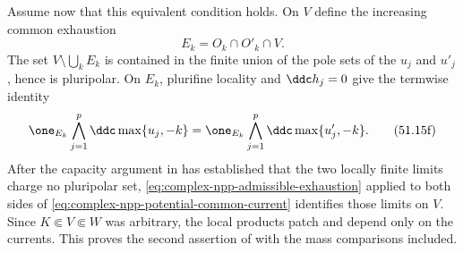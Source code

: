 Assume now that this equivalent condition holds.  On \(V\) define the
increasing common exhaustion
\[
                         E_k=O_k\cap O'_k\cap V.
\]
The set \(V\setminus\bigcup_kE_k\) is contained in the finite union of the
pole sets of the \(u_j\) and \(u'_j\), hence is pluripolar.  On \(E_k\),
plurifine locality and \(\ddc h_j=0\) give the termwise identity
\[
 \one_{E_k}\bigwedge_{j=1}^p\ddc\max\{u_j,-k\}
 =\one_{E_k}\bigwedge_{j=1}^p\ddc\max\{u'_j,-k\}.
\tag{51.15f}\label{eq:complex-npp-potential-common-current}
\]
After the capacity argument in  has established
that the two locally finite limits charge no pluripolar set,
\eqref{eq:complex-npp-admissible-exhaustion} applied to both sides of
\eqref{eq:complex-npp-potential-common-current} identifies those limits on
\(V\).  Since \(K\Subset V\Subset W\) was arbitrary, the local products patch
and depend only on the currents.  This proves the second assertion of
\cite[Proposition~1.4]{BEGZ10} with the mass comparisons included.
